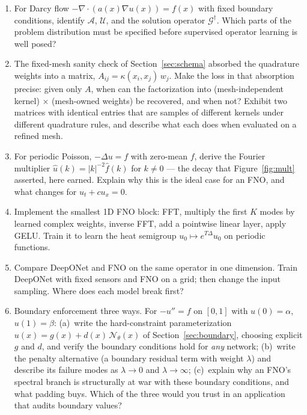 \documentclass[10pt,a4paper]{article}
\newcommand{\G}{\mathcal{G}}
\newcommand{\A}{\mathcal{A}}
\newcommand{\U}{\mathcal{U}}
\begin{document}
\begin{enumerate}
\item For Darcy flow
$-\nabla\cdot(a(x)\nabla u(x)) = f(x)$ with fixed boundary conditions,
identify $\A$, $\U$, and the solution operator $\G^\dagger$. Which parts of
the problem distribution must be specified before supervised operator learning
is well posed?

\item The fixed-mesh sanity check of Section~\ref{sec:schema} absorbed
the quadrature weights into a matrix, $A_{ij} = \kappa(x_i,x_j)\,w_j$.
Make the loss in that absorption precise: given only $A$, when can the
factorization into (mesh-independent kernel) $\times$ (mesh-owned weights)
be recovered, and when not? Exhibit two matrices with identical entries
that are samples of different kernels under different quadrature rules,
and describe what each does when evaluated on a refined mesh.

\item For periodic Poisson,
$-\Delta u = f$ with zero-mean $f$, derive the Fourier multiplier
$\widehat{u}(k)=|k|^{-2}\widehat{f}(k)$ for $k\neq0$ --- the decay that
Figure~\ref{fig:mult} asserted, here earned. Explain why this is the
ideal case for an FNO, and what changes for $u_t + c u_x = 0$.

\item Implement the smallest 1D FNO block: FFT, multiply the first $K$ modes
by learned complex weights, inverse FFT, add a pointwise linear layer, apply
GELU. Train it to learn the heat semigroup
$u_0 \mapsto e^{T\Delta}u_0$ on periodic functions.

\item Compare DeepONet and FNO on the same operator in one dimension. Train
DeepONet with fixed sensors and FNO on a grid; then change the input sampling.
Where does each model break first?

\item Boundary enforcement three ways. For $-u'' = f$ on $[0,1]$ with
$u(0) = \alpha$, $u(1) = \beta$: (a)~write the hard-constraint
parameterization $u(x) = g(x) + d(x)\,\mathcal{N}_\theta(x)$ of
Section~\ref{sec:boundary}, choosing explicit $g$ and $d$, and verify the
boundary conditions hold for \emph{any} network; (b)~write the penalty
alternative (a boundary residual term with weight $\lambda$) and describe
its failure modes as $\lambda \to 0$ and $\lambda \to \infty$; (c)~explain
why an FNO's spectral branch is structurally at war with these boundary
conditions, and what padding buys. Which of the three would you trust in
an application that audits boundary values?


\end{enumerate}
\end{document}

